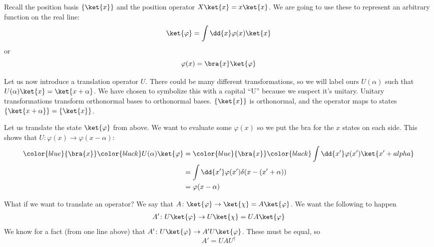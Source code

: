 \documentclass[a4paper,twoside,master.tex]{subfiles}
\begin{document}
Recall the position basis $ \{\ket{x}\} $ and the position operator $ X \ket{x} = x \ket{x} $. We are going to use these to represent an arbitrary function on the real line:
\begin{equation}
    \ket{\varphi} = \int \dd{x} \varphi(x) \ket{x}
\end{equation}
or
\begin{equation}
    \varphi(x) = \bra{x} \ket{\varphi}
\end{equation}

Let us now introduce a translation operator $ U $. There could be many different transformations, so we will label ours $ U(\alpha) $ such that $ U(\alpha) \ket{x} = \ket{x + \alpha} $. We have chosen to symbolize this with a capital ``U'' because we suspect it's unitary. Unitary transformations transform orthonormal bases to orthonormal bases. $ \{\ket{x}\} $ is orthonormal, and the operator maps to states $ \{\ket{x + \alpha}\} = \{\ket{x}\}$.

Let us translate the state $ \ket{\varphi} $ from above. We want to evaluate some $ \varphi(x) $ so we put the bra for the $ x $ states on each side. This shows that $ U\colon \varphi(x) \to \varphi(x - \alpha) $:
\begin{align}
    \color{blue}{\bra{x}}\color{black} U(\alpha) \ket{\varphi} &= \color{blue}{\bra{x}}\color{black} \int \dd{x'} \varphi(x') \ket{x'+alpha}\\
    &= \int \dd{x'} \varphi(x') \delta(x-(x' + \alpha))\\
    &= \varphi(x - \alpha)
\end{align}

What if we want to translate an operator? We say that $ A\colon \ket{\varphi} \to \ket{\chi} = A \ket{\varphi} $. We want the following to happen
\begin{align}
    A'\colon U \ket{\varphi} \to U \ket{\chi} = U A \ket{\varphi} 
\end{align}
We know for a fact (from one line above) that $ A' \colon U\ket{\varphi} \to A'U \ket{\varphi} $. These must be equal, so
\begin{equation}
    A' = U A U^\dagger
\end{equation}
\end{document}
